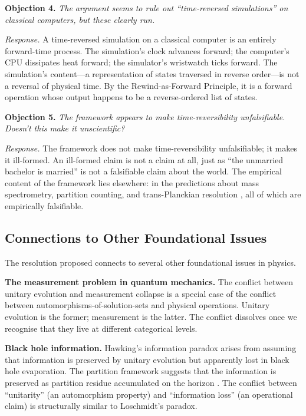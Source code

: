 \documentclass[twocolumn,10pt,a4paper]{article}
\theoremstyle{definition}
\theoremstyle{remark}
\begin{document}
\textbf{Objection 4.} \emph{The argument seems to rule out ``time-reversed simulations'' on classical computers, but these clearly run.}

\emph{Response.} A time-reversed simulation on a classical computer is an entirely forward-time process. The simulation's clock advances forward; the computer's CPU dissipates heat forward; the simulator's wristwatch ticks forward. The simulation's content---a representation of states traversed in reverse order---is not a reversal of physical time. By the Rewind-as-Forward Principle, it is a forward operation whose output happens to be a reverse-ordered list of states.

\textbf{Objection 5.} \emph{The framework appears to make time-reversibility unfalsifiable. Doesn't this make it unscientific?}

\emph{Response.} The framework does not make time-reversibility unfalsifiable; it makes it ill-formed. An ill-formed claim is not a claim at all, just as ``the unmarried bachelor is married'' is not a falsifiable claim about the world. The empirical content of the framework lies elsewhere: in the predictions about mass spectrometry, partition counting, and trans-Planckian resolution \citep{sachikonye2025temporal}, all of which are empirically falsifiable.

\subsection{Connections to Other Foundational Issues}

The resolution proposed connects to several other foundational issues in physics.

\textbf{The measurement problem in quantum mechanics.} The conflict between unitary evolution and measurement collapse is a special case of the conflict between automorphisms-of-solution-sets and physical operations. Unitary evolution is the former; measurement is the latter. The conflict dissolves once we recognise that they live at different categorical levels.

\textbf{Black hole information.} Hawking's information paradox \citep{hawking1976} arises from assuming that information is preserved by unitary evolution but apparently lost in black hole evaporation. The partition framework suggests that the information is preserved as partition residue accumulated on the horizon \citep{sachikonye2025loschmidt}. The conflict between ``unitarity'' (an automorphism property) and ``information loss'' (an operational claim) is structurally similar to Loschmidt's paradox.
\end{document}
